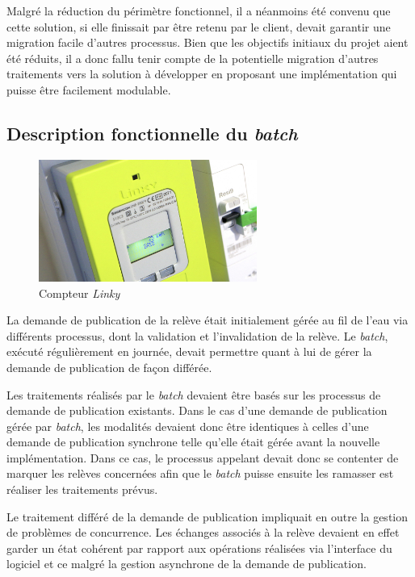 \documentclass[a4paper, 12pt]{report}
\begin{document}
Malgré la réduction du périmètre fonctionnel, il a néanmoins été convenu que cette solution, si elle finissait par être retenu par le client, devait garantir une migration facile d'autres processus. Bien que les objectifs initiaux du projet aient été réduits, il a donc fallu tenir compte de la potentielle migration d'autres traitements vers la solution à développer en proposant une implémentation qui puisse être facilement modulable.

\subsection{Description fonctionnelle du \textit{batch}}

\begin{figure}[t]
  \begin{center}
    \includegraphics[height=4cm]{../res/linky.jpg}
    \caption{Compteur \textit{Linky}}
    \label{linky}
  \end{center}
\end{figure}

La demande de publication de la relève était initialement gérée au fil de l'eau via différents processus, dont la validation et l'invalidation de la relève. Le \textit{batch}, exécuté régulièrement en journée, devait permettre quant à lui de gérer la demande de publication de façon différée. 

Les traitements réalisés par le \textit{batch} devaient être basés sur les processus de demande de publication existants. Dans le cas d'une demande de publication gérée par \textit{batch}, les modalités devaient donc être identiques à celles d'une demande de publication synchrone telle qu'elle était gérée avant la nouvelle implémentation. Dans ce cas, le processus appelant devait donc se contenter de marquer les relèves concernées afin que le \textit{batch} puisse ensuite les ramasser est réaliser les traitements prévus.

Le traitement différé de la demande de publication impliquait en outre la gestion de problèmes de concurrence. Les échanges associés à la relève devaient en effet garder un état cohérent par rapport aux opérations réalisées via l'interface du logiciel et ce malgré la gestion asynchrone de la demande de publication.\\
\end{document}
